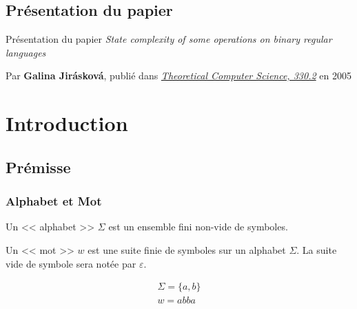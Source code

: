 
\subsection{Présentation du papier}


\begin{frame}{\myframetitle}
  \begin{block}{Présentation du papier}
    \textit{State complexity of some operations on binary regular
    languages}\footnotemark{}

    \vphantom{}

    Par \textbf{Galina Jirásková}, publié dans
    \textit{\underline{Theoretical Computer Science, 330.2}}
    en 2005
  \end{block}
\end{frame}

\section{Introduction}

\subsection{Prémisse}

\subsubsection{Alphabet et Mot}


\begin{frame}{\myframetitle}
  \begin{definition}[Alphabet]
    Un << alphabet >> \(\Sigma\) est un ensemble fini non-vide de symboles.
  \end{definition}

  \pause[]

  \begin{definition}[Mot]
    Un << mot >> \(w\) est une suite finie de symboles sur un alphabet
    \(\Sigma\). La suite vide de symbole sera notée par \(\varepsilon\).
  \end{definition}

  \pause[]

  \begin{example}
    \centering
    \vspace{-1.5\topsep}
    \begin{gather*}
      \Sigma = \{a, b\} \\
      w = abba
    \end{gather*}
  \end{example}
\end{frame}

